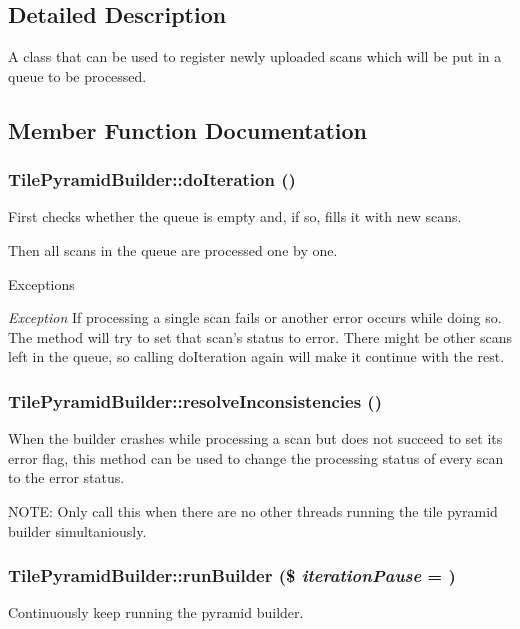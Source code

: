 \subsection{Detailed Description}
A class that can be used to register newly uploaded scans which will be put in a queue to be processed. 

\subsection{Member Function Documentation}
\hypertarget{classTilePyramidBuilder_a694bcf5f6a6c8d15326d68408155e9cd}{
\subsubsection[{doIteration}]{\setlength{\rightskip}{0pt plus 5cm}TilePyramidBuilder::doIteration ()}}
\label{classTilePyramidBuilder_a694bcf5f6a6c8d15326d68408155e9cd}
First checks whether the queue is empty and, if so, fills it with new scans.

Then all scans in the queue are processed one by one.


\begin{DoxyExceptions}{Exceptions}
\item[{\em Exception}]If processing a single scan fails or another error occurs while doing so. The method will try to set that scan's status to error. There might be other scans left in the queue, so calling doIteration again will make it continue with the rest. \end{DoxyExceptions}
\hypertarget{classTilePyramidBuilder_ab0b4e43e682c9e3577d43f3af26838f7}{
\subsubsection[{resolveInconsistencies}]{\setlength{\rightskip}{0pt plus 5cm}TilePyramidBuilder::resolveInconsistencies ()}}
\label{classTilePyramidBuilder_ab0b4e43e682c9e3577d43f3af26838f7}
When the builder crashes while processing a scan but does not succeed to set its error flag, this method can be used to change the processing status of every scan to the error status.

NOTE: Only call this when there are no other threads running the tile pyramid builder simultaniously. \hypertarget{classTilePyramidBuilder_a2daaa252ca14e474fbf92466c98abf46}{
\subsubsection[{runBuilder}]{\setlength{\rightskip}{0pt plus 5cm}TilePyramidBuilder::runBuilder (\$ {\em iterationPause} = {})}}
\label{classTilePyramidBuilder_a2daaa252ca14e474fbf92466c98abf46}
Continuously keep running the pyramid builder.

